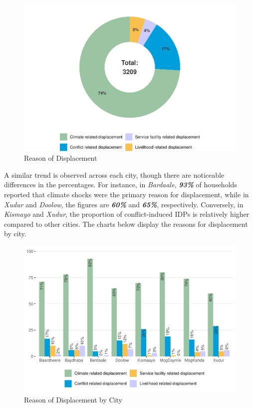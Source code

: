 \documentclass[
]{article}
\begin{document}
\begin{figure}[H]

{\centering \includegraphics[width=0.7\linewidth,height=0.7\textheight]{climate_vs_conflict_files/figure-latex/dis_type-1} 

}

\caption{Reason of Displacement}\label{fig:dis_type}
\end{figure}

A similar trend is observed across each city, though there are
noticeable differences in the percentages. For instance, in
\emph{Bardaale}, \textbf{\emph{93\%}} of households reported that
climate shocks were the primary reason for displacement, while in
\emph{Xudur} and \emph{Doolow}, the figures are \textbf{\emph{60\%}} and
\textbf{\emph{65\%}}, respectively. Conversely, in \emph{Kismayo} and
\emph{Xudur}, the proportion of conflict-induced IDPs is relatively
higher compared to other cities. The charts below display the reasons
for displacement by city.

\begin{figure}[H]

{\centering \includegraphics[width=0.7\linewidth,height=0.7\textheight]{climate_vs_conflict_files/figure-latex/dis_type_city-1} 

}

\caption{Reason of Displacement by City}\label{fig:dis_type_city}
\end{figure}
\end{document}
